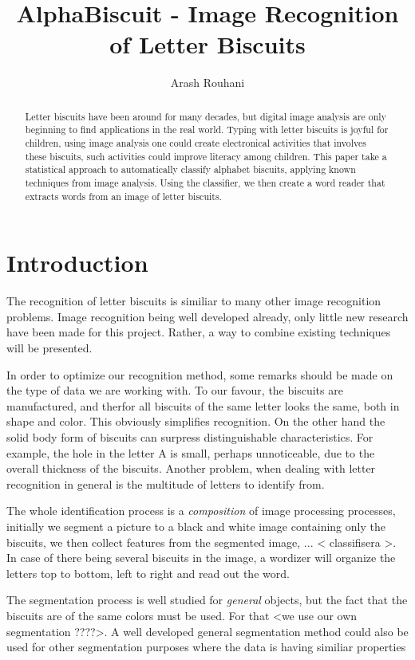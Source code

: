 \documentclass[a4paper,11pt]{article}
\title{AlphaBiscuit - Image Recognition of Letter Biscuits}
\author{Arash Rouhani}
\begin{document}
\maketitle

\begin{abstract}
    Letter biscuits have been around for many decades, but digital image
analysis are only beginning to find applications in the real world.
Typing with letter biscuits is joyful for children, using image analysis
one could create electronical activities that involves these biscuits,
such activities could improve literacy among children. This paper take
a statistical approach to automatically classify alphabet biscuits,
applying known techniques from image analysis. Using the classifier, we
then create a word reader that extracts words from an image of letter
biscuits.

\end{abstract}

\section{Introduction}
The recognition of letter biscuits is similiar to many other image recognition problems.
Image recognition being well developed already, only little new research have been made for this project.
Rather, a way to combine existing techniques will be presented.

In order to optimize our recognition method, some remarks should be made on the type of data we are working with.
To our favour, the biscuits are manufactured, and therfor all biscuits of the same letter looks the same, both in shape and color. This obviously simplifies recognition.
On the other hand the solid body form of biscuits can surpress distinguishable characteristics. For example, the hole in the letter A is small, perhaps unnoticeable, due to the overall thickness of the biscuits. Another problem, when dealing with letter recognition in general is the multitude of letters to identify from.

The whole identification process is a \emph{composition} of image processing processes, 
initially we segment a picture to a black and white image containing only the biscuits, 
we then collect features from the segmented image, 
... < classifisera >.
In case of there being several biscuits in the image, a wordizer will organize the letters top to bottom, left to right and read out the word.

The segmentation process is well studied for \emph{general} objects, but the fact that the biscuits are of the same colors must be used. For that <we use our own segmentation ????>.
A well developed general segmentation method could also be used for other segmentation purposes where the data is having similiar properties
\end{document}
